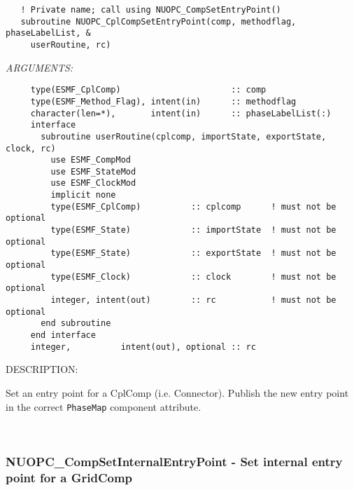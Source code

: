   
\begin{verbatim}   ! Private name; call using NUOPC_CompSetEntryPoint()
   subroutine NUOPC_CplCompSetEntryPoint(comp, methodflag, phaseLabelList, &
     userRoutine, rc)\end{verbatim}{\em ARGUMENTS:}
\begin{verbatim}     type(ESMF_CplComp)                      :: comp
     type(ESMF_Method_Flag), intent(in)      :: methodflag
     character(len=*),       intent(in)      :: phaseLabelList(:)
     interface
       subroutine userRoutine(cplcomp, importState, exportState, clock, rc)
         use ESMF_CompMod
         use ESMF_StateMod
         use ESMF_ClockMod
         implicit none
         type(ESMF_CplComp)          :: cplcomp      ! must not be optional
         type(ESMF_State)            :: importState  ! must not be optional
         type(ESMF_State)            :: exportState  ! must not be optional
         type(ESMF_Clock)            :: clock        ! must not be optional
         integer, intent(out)        :: rc           ! must not be optional
       end subroutine
     end interface
     integer,          intent(out), optional :: rc \end{verbatim}
{\sf DESCRIPTION:\\ }


   Set an entry point for a CplComp (i.e. Connector). Publish
   the new entry point in the correct {\tt PhaseMap} component attribute. 
 
\mbox{}\hrulefill\ 
 
\subsubsection [NUOPC\_CompSetInternalEntryPoint] {NUOPC\_CompSetInternalEntryPoint - Set internal entry point for a GridComp}


